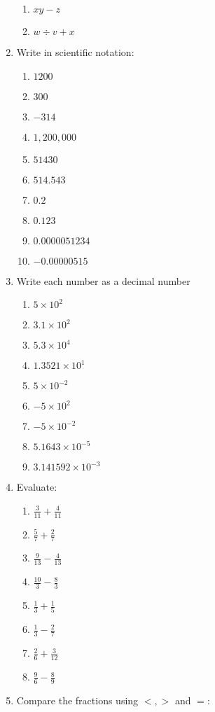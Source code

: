 \documentclass{article}
\begin{document}
\begin{multicols}{2}
\begin{enumerate}
\begin{enumerate}
		\item $xy-z$
		\item $w\div v +x$
	\end{enumerate}
	\item Write in scientific notation:
	\begin{enumerate}
		\item $1200$
		\item $300$
		\item $-314$
		\item $1,200,000$
		\item $51430$
		\item $514.543$
		\item $0.2$
		\item $0.123$
		\item $0.0000051234$
		\item $-0.00000515$ 
	\end{enumerate}
	\item Write each number as a decimal number
	\begin{enumerate}
		\item $5 \times 10^2$
		\item $3.1 \times 10^2$
		\item $5.3 \times 10^4$
		\item $1.3521 \times 10^1$
		\item $5 \times 10^{-2}$
		\item $-5 \times 10^2$
		\item $-5 \times 10^{-2}$
		\item $5.1643 \times 10^{-5}$
		\item $3.141592 \times 10^{-3}$
	\end{enumerate}
	\item Evaluate:
	\begin{enumerate}
		\item $\frac{3}{11} + \frac{4}{11}$
		\item $\frac{5}{7} + \frac{2}{7}$
		\item $\frac{9}{13} - \frac{4}{13}$
		\item $\frac{10}{3} - \frac{8}{3}$
		\item $\frac{1}{3} + \frac{1}{5}$
		\item $\frac{1}{3} - \frac{2}{7}$
		\item $\frac{2}{6} + \frac{3}{12}$
		\item $\frac{9}{6} - \frac{8}{9}$
	\end{enumerate}
	\item Compare the fractions using $<, >$ and $=$:

\end{enumerate}
\end{multicols}
\end{document}
